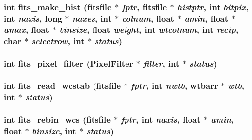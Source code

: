 \subsubsection{\setlength{\rightskip}{0pt plus 5cm}int fits\_\-make\_\-hist (\bf{fitsfile} $\ast$ {\em fptr}, \bf{fitsfile} $\ast$ {\em histptr}, int {\em bitpix}, int {\em naxis}, long $\ast$ {\em naxes}, int $\ast$ {\em colnum}, float $\ast$ {\em amin}, float $\ast$ {\em amax}, float $\ast$ {\em binsize}, float {\em weight}, int {\em wtcolnum}, int {\em recip}, char $\ast$ {\em selectrow}, int $\ast$ {\em status})}\label{fitsio__64_8h_3f352373829dc5bb502287246017a0da}


\subsubsection{\setlength{\rightskip}{0pt plus 5cm}int fits\_\-pixel\_\-filter (\bf{Pixel\-Filter} $\ast$ {\em filter}, int $\ast$ {\em status})}\label{fitsio__64_8h_69443475c41bee4c7f7f88c4f03677b5}


\subsubsection{\setlength{\rightskip}{0pt plus 5cm}int fits\_\-read\_\-wcstab (\bf{fitsfile} $\ast$ {\em fptr}, int {\em nwtb}, \bf{wtbarr} $\ast$ {\em wtb}, int $\ast$ {\em status})}\label{fitsio__64_8h_96c804d78d44901bc5d497b30e47b7ad}


\subsubsection{\setlength{\rightskip}{0pt plus 5cm}int fits\_\-rebin\_\-wcs (\bf{fitsfile} $\ast$ {\em fptr}, int {\em naxis}, float $\ast$ {\em amin}, float $\ast$ {\em binsize}, int $\ast$ {\em status})}\label{fitsio__64_8h_5f8894060e02e765fe5b903552a4ed2b}


